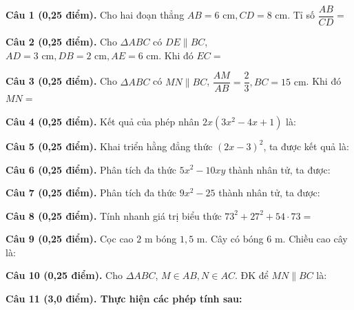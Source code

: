 \documentclass[12pt,a4paper]{article}
\begin{document}
\vspace{1.2mm}
\noindent\textbf{Câu 1 (0,25 điểm).} Cho hai đoạn thẳng $AB = 6\text{ cm}, CD = 8\text{ cm}$. Tỉ số $\dfrac{AB}{CD} =$ \par\vspace{3.0mm}
\noindent\textbf{Câu 2 (0,25 điểm).} Cho $\Delta ABC$ có $DE \parallel BC$, $AD = 3\text{ cm}, DB = 2\text{ cm}, AE = 6\text{ cm}$. Khi đó $EC =$ \par\vspace{3.0mm}
\noindent\textbf{Câu 3 (0,25 điểm).} Cho $\Delta ABC$ có $MN \parallel BC$, $\dfrac{AM}{AB} = \dfrac{2}{3}, BC = 15\text{ cm}$. Khi đó $MN =$ \par\vspace{3.0mm}
\noindent\textbf{Câu 4 (0,25 điểm).} Kết quả của phép nhân $2x(3x^2 - 4x + 1)$ là: \par\vspace{3.0mm}
\noindent\textbf{Câu 5 (0,25 điểm).} Khai triển hằng đẳng thức $(2x - 3)^2$, ta được kết quả là: \par\vspace{3.0mm}
\noindent\textbf{Câu 6 (0,25 điểm).} Phân tích đa thức $5x^2 - 10xy$ thành nhân tử, ta được: \par\vspace{3.0mm}
\noindent\textbf{Câu 7 (0,25 điểm).} Phân tích đa thức $9x^2 - 25$ thành nhân tử, ta được: \par\vspace{3.0mm}
\noindent\textbf{Câu 8 (0,25 điểm).} Tính nhanh giá trị biểu thức $73^2 + 27^2 + 54 \cdot 73 =$ \par\vspace{3.0mm}
\noindent\textbf{Câu 9 (0,25 điểm).} Cọc cao $2\text{ m}$ bóng $1{,}5\text{ m}$. Cây có bóng $6\text{ m}$. Chiều cao cây là: \par\vspace{3.0mm}
\noindent\textbf{Câu 10 (0,25 điểm).} Cho $\Delta ABC$, $M \in AB, N \in AC$. ĐK để $MN \parallel BC$ là: \par\vspace{3.0mm}
\vspace{0.4mm}
\noindent\textbf{Câu 11 (3,0 điểm). Thực hiện các phép tính sau:}
\vspace{0.6mm}
\end{document}
